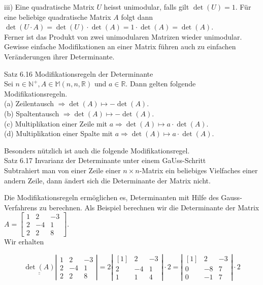 \documentclass[10pt]{article}
\begin{document}
iii) Eine quadratische Matrix $U$ heisst unimodular, falls gilt $\operatorname{det}(U)=1$. Für eine beliebige quadratische Matrix $A$ folgt dann\\
$\operatorname{det}(U \cdot A)=\operatorname{det}(U) \cdot \operatorname{det}(A)=1 \cdot \operatorname{det}(A)=\operatorname{det}(A)$.\\
Ferner ist das Produkt von zwei unimodularen Matrizen wieder unimodular.\\
Gewisse einfache Modifikationen an einer Matrix führen auch zu einfachen Veränderungen ihrer Determinante.

Satz 6.16 Modifikationsregeln der Determinante\\
Sei $n \in \mathbb{N}^{+}, A \in \mathbb{M}(n, n, \mathbb{R})$ und $a \in \mathbb{R}$. Dann gelten folgende Modifikationsregeln.\\
(a) Zeilentausch $\Rightarrow \operatorname{det}(A) \mapsto-\operatorname{det}(A)$.\\
(b) Spaltentausch $\Rightarrow \operatorname{det}(A) \mapsto-\operatorname{det}(A)$.\\
(c) Multiplikation einer Zeile mit $a \Rightarrow \operatorname{det}(A) \mapsto a \cdot \operatorname{det}(A)$.\\
(d) Multiplikation einer Spalte mit $a \Rightarrow \operatorname{det}(A) \mapsto a \cdot \operatorname{det}(A)$.

Besonders nützlich ist auch die folgende Modifikationsregel.\\
Satz 6.17 Invarianz der Determinante unter einem GaUss-Schritt\\
Subtrahiert man von einer Zeile einer $n \times n$-Matrix ein beliebiges Vielfaches einer andern Zeile, dann ändert sich die Determinante der Matrix nicht.

Die Modifikationsregeln ermöglichen es, Determinanten mit Hilfe des Gauss-Verfahrens zu berechnen. Als Beispiel berechnen wir die Determinante der Matrix\\
$A=\left[\begin{array}{rrr}1 & 2 & -3 \\ 2 & -4 & 1 \\ 2 & 2 & 8\end{array}\right]$.\\
Wir erhalten

\[
\underline{\underline{\operatorname{det}(A)}}\left|\begin{array}{rrr}1 & 2 & -3  \tag{6.125}\\ 2 & -4 & 1 \\ 2 & 2 & 8\end{array}\right|=2\left|\begin{array}{rrr}{[1]} & 2 & -3 \\ 2 & -4 & 1 \\ 1 & 1 & 4\end{array}\right| \cdot 2=\left|\begin{array}{rrr}{[1]} & 2 & -3 \\ 0 & -8 & 7 \\ 0 & -1 & 7\end{array}\right| \cdot 2
\]
\end{document}
